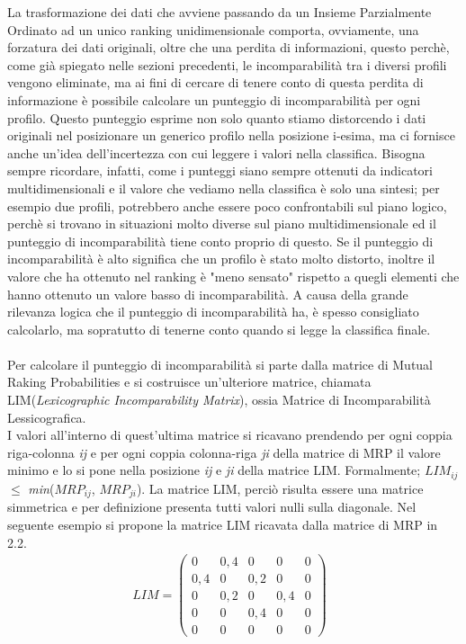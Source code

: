 \documentclass[a4paper,12pt, openright]{report}
\begin{document}
La trasformazione dei dati che avviene passando da un Insieme Parzialmente Ordinato ad un unico ranking unidimensionale comporta, ovviamente, una forzatura 
dei dati originali, oltre che una perdita di informazioni, questo perchè, come già spiegato nelle sezioni precedenti, le incomparabilità tra i diversi profili
vengono eliminate, ma ai fini di cercare di tenere conto di questa perdita di informazione è possibile calcolare un punteggio di incomparabilità per ogni profilo. 
Questo 
punteggio esprime non solo quanto stiamo distorcendo i dati originali nel posizionare un generico profilo nella posizione i-esima, ma ci fornisce anche un'idea 
dell'incertezza con cui leggere i valori nella classifica. Bisogna sempre ricordare, infatti, come i punteggi siano sempre ottenuti da indicatori multidimensionali 
e il valore 
che vediamo nella classifica è solo una sintesi; per esempio due profili, potrebbero anche essere poco confrontabili sul piano logico, perchè si trovano in 
situazioni molto 
diverse sul piano multidimensionale ed il punteggio di incomparabilità tiene conto proprio di questo. Se il punteggio di incomparabilità è alto significa che un 
profilo è stato molto distorto, inoltre il valore che ha ottenuto nel ranking è "meno sensato" rispetto a quegli elementi che hanno ottenuto un valore basso di 
incomparabilità.
A causa della grande rilevanza logica che il punteggio di 
incomparabilità ha, è spesso consigliato calcolarlo, ma sopratutto di tenerne conto quando si legge la classifica finale. 
\\
\\
Per calcolare il punteggio di incomparabilità si parte dalla matrice di Mutual Raking Probabilities e si costruisce un'ulteriore matrice, chiamata 
LIM(\textit{Lexicographic Incomparability Matrix}), ossia Matrice di Incomparabilità Lessicografica. \\
I valori all'interno di quest'ultima matrice si ricavano prendendo per ogni coppia riga-colonna \textit{ij} e per ogni coppia colonna-riga \textit{ji} della 
matrice di MRP il valore minimo e lo si pone nella posizione \textit{ij} e \textit{ji} della matrice LIM. Formalmente; $LIM_{ij}$ $\leq$ \textit{min}($MRP_{ij}$, $MRP_{ji}$).
La matrice LIM, perciò risulta essere una matrice simmetrica e per definizione presenta tutti valori nulli sulla diagonale. Nel seguente esempio si propone la 
matrice LIM ricavata dalla matrice di MRP in 2.2.\\

\begin{align}
    LIM = 
    \left( \begin{array}{ccccc} 0 & 0,4 & 0 & 0 & 0 \\
        0,4 & 0 & 0,2 & 0 & 0\\
        0 & 0,2 & 0 & 0,4 & 0\\
        0 & 0 & 0,4 & 0 & 0\\
        0 & 0 & 0 & 0 & 0 \end{array} \right)
    \mbox{                  }
\end{align}
\end{document}
